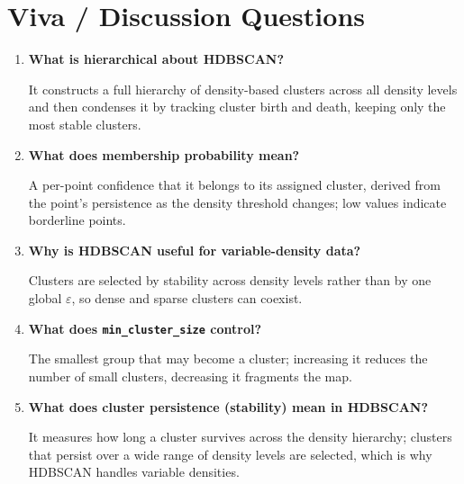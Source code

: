 \section{Viva / Discussion Questions}
\begin{enumerate}
  \item \textbf{What is hierarchical about HDBSCAN?}\par\nobreak It constructs a full hierarchy of density-based
  clusters across all density levels and then condenses it by tracking cluster birth and death,
  keeping only the most stable clusters.
  \item \textbf{What does membership probability mean?}\par\nobreak A per-point confidence that it belongs to its
  assigned cluster, derived from the point's persistence as the density threshold changes;
  low values indicate borderline points.
  \item \textbf{Why is HDBSCAN useful for variable-density data?}\par\nobreak Clusters are selected by stability
  across density levels rather than by one global $\varepsilon$, so dense and sparse clusters
  can coexist.
  \item \textbf{What does \texttt{min\_cluster\_size} control?}\par\nobreak The smallest group that may become a
  cluster; increasing it reduces the number of small clusters, decreasing it fragments the map.
\item \textbf{What does cluster persistence (stability) mean in HDBSCAN?}\par\nobreak It measures how long a cluster survives across the density hierarchy; clusters that persist over a wide range of density levels are selected, which is why HDBSCAN handles variable densities.
\end{enumerate}

